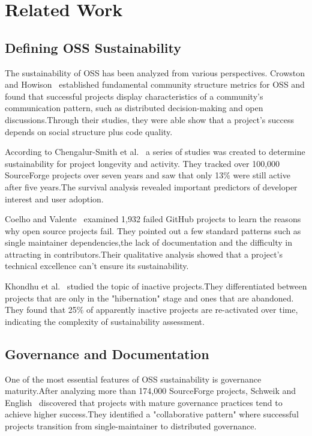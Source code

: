 \documentclass[conference]{IEEEtran}
\begin{document}
\section{Related Work}

\subsection{Defining OSS Sustainability}

The sustainability of OSS has been analyzed from various perspectives. Crowston and Howison~\cite{crowston2005} established fundamental community structure metrics for OSS and found that successful projects display characteristics of a community's communication pattern, such as distributed decision-making and open discussions.Through their studies, they were able show that a project's success depends on social structure plus code quality.

According to Chengalur-Smith et al.~\cite{chengalur2010} a series of studies was created to determine sustainability for project longevity and activity. They tracked over 100,000 SourceForge projects over seven years and saw that only 13\% were still active after five years.The survival analysis revealed important predictors of developer interest and user adoption.

Coelho and Valente~\cite{coelho2017} examined 1,932 failed GitHub projects to learn the reasons why open source projects fail. They pointed out a few standard patterns such as single maintainer dependencies,the lack of documentation and the difficulty in attracting in contributors.Their qualitative analysis showed that a project's technical excellence can't ensure its sustainability.

Khondhu et al.~\cite{khondhu2013} studied the topic of inactive projects.They differentiated between projects that are only in the "hibernation" stage and ones that are abandoned. They found that 25\% of apparently inactive projects are re-activated over time, indicating the complexity of sustainability assessment.

\subsection{Governance and Documentation}

One of the most essential features of OSS sustainability is governance maturity.After analyzing more than 174,000 SourceForge projects, Schweik and English~\cite{schweik2012} discovered that projects with mature governance practices tend to achieve higher success.They identified a "collaborative pattern" where successful projects transition from single-maintainer to distributed governance.
\end{document}
